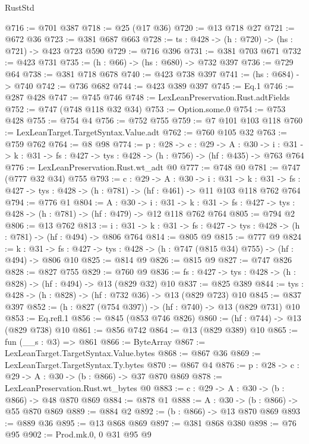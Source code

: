 \begin{lexlean}{RustStd}
\begin{coremodule}
{\begin{coremodule}
{@716 := @701 @387
@718 := @25 (@17 @36)
@720 := @13 @718 @27
@721 := @672 @36
@723 := @381 @687 @663
@728 := {ts : @428} -> (h : @720) -> (hs : @721) -> @423 @723 @590
@729 := @716 @396
@731 := @381 @703 @671
@732 := @423 @731
@735 := (h : @66) -> (hs : @680) -> @732 @397
@736 := @729 @64
@738 := @381 @718 @678
@740 := @423 @738 @397
@741 := (hs : @684) -> @740
@742 := @736 @682
@744 := @423 @389 @397
@745 := Eq.{1}
@746 := @287 @428
@747 := @745 @746
@748 := LexLeanPreservation.Rust.adtFields
@752 := @747 (@748 @118 @32 @34)
@753 := Option.some.{0}
@754 := @753 @428
@755 := @754 @4
@756 := @752 @755
@759 := @7 @101 @103 @118
@760 := LexLeanTarget.TargetSyntax.Value.adt
@762 := @760 @105 @32
@763 := @759 @762
@764 := @8 @98
@774 := {p : @28} ->
  {c : @29} ->
  {A : @30} ->
  {i : @31} -> {k : @31} -> {fs : @427} -> {tys : @428} -> (h : @756) -> (hf : @435) -> @763 @764
@776 := LexLeanPreservation.Rust.wt_adt @0
@777 := @748 @0
@781 := @747 (@777 @32 @34) @755
@793 := {c : @29} ->
  {A : @30} ->
  {i : @31} ->
  {k : @31} -> {fs : @427} -> {tys : @428} -> (h : @781) -> (hf : @461) -> @11 @103 @118 @762 @764
@794 := @776 @1
@804 := {A : @30} ->
  {i : @31} ->
  {k : @31} -> {fs : @427} -> {tys : @428} -> (h : @781) -> (hf : @479) -> @12 @118 @762 @764
@805 := @794 @2
@806 := @13 @762
@813 := {i : @31} ->
  {k : @31} -> {fs : @427} -> {tys : @428} -> (h : @781) -> (hf : @494) -> @806 @764
@814 := @805 @9
@815 := @777 @9
@824 := {k : @31} ->
  {fs : @427} -> {tys : @428} -> (h : @747 (@815 @34) @755) -> (hf : @494) -> @806 @10
@825 := @814 @9
@826 := @815 @9
@827 := @747 @826
@828 := @827 @755
@829 := @760 @9
@836 := {fs : @427} -> {tys : @428} -> (h : @828) -> (hf : @494) -> @13 (@829 @32) @10
@837 := @825 @389
@844 := {tys : @428} -> (h : @828) -> (hf : @732 @36) -> @13 (@829 @723) @10
@845 := @837 @397
@852 := (h : @827 (@754 @397)) -> (hf : @740) -> @13 (@829 @731) @10
@853 := Eq.refl.{1}
@856 := @845 (@853 @746 @826)
@860 := (hf : @744) -> @13 (@829 @738) @10
@861 := @856 @742
@864 := @13 (@829 @389) @10
@865 := fun (__s : @3) => @861
@866 := ByteArray
@867 := LexLeanTarget.TargetSyntax.Value.bytes
@868 := @867 @36
@869 := LexLeanTarget.TargetSyntax.Ty.bytes
@870 := @867 @4
@876 := {p : @28} -> {c : @29} -> {A : @30} -> (b : @866) -> @37 @870 @869
@878 := LexLeanPreservation.Rust.wt_bytes @0
@883 := {c : @29} -> {A : @30} -> (b : @866) -> @48 @870 @869
@884 := @878 @1
@888 := {A : @30} -> (b : @866) -> @55 @870 @869
@889 := @884 @2
@892 := (b : @866) -> @13 @870 @869
@893 := @889 @36
@895 := @13 @868 @869
@897 := @381 @868 @380
@898 := @76 @95
@902 := Prod.mk.{0, 0} @31 @95 @9
}
\end{coremodule}}
\end{coremodule}
\end{lexlean}
